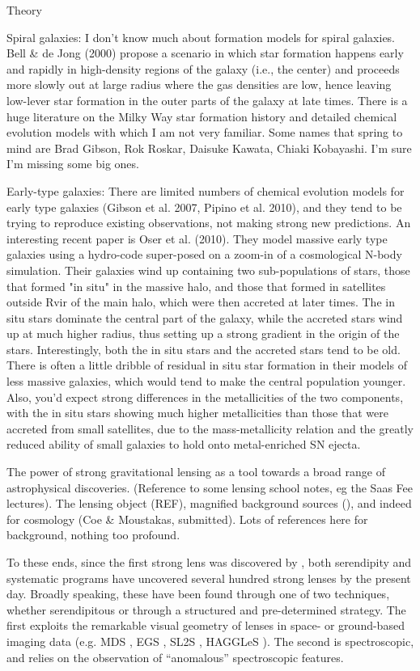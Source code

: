 \message{ !name(clashresolved.tex)}\documentclass{emulateapj}
\begin{document}
Theory

Spiral galaxies: I don't know much about formation models for spiral
galaxies.  Bell \& de Jong (2000) propose a scenario in which star
formation happens early and rapidly in high-density regions of the
galaxy (i.e., the center) and proceeds more slowly out at large radius
where the gas densities are low, hence leaving low-lever star
formation in the outer parts of the galaxy at late times.  There is a
huge literature on the Milky Way star formation history and detailed
chemical evolution models with which I am not very familiar.  Some
names that spring to mind are Brad Gibson, Rok Roskar, Daisuke Kawata,
Chiaki Kobayashi.  I'm sure I'm missing some big ones.

Early-type galaxies: There are limited numbers of chemical evolution
models for early type galaxies (Gibson et al. 2007, Pipino et
al. 2010), and they tend to be trying to reproduce existing
observations, not making strong new predictions.  An interesting
recent paper is Oser et al. (2010).  They model massive early type
galaxies using a hydro-code super-posed on a zoom-in of a cosmological
N-body simulation.  Their galaxies wind up containing two
sub-populations of stars, those that formed "in situ" in the massive
halo, and those that formed in satellites outside Rvir of the main
halo, which were then accreted at later times.  The in situ stars
dominate the central part of the galaxy, while the accreted stars wind
up at much higher radius, thus setting up a strong gradient in the
origin of the stars.  Interestingly, both the in situ stars and the
accreted stars tend to be old.  There is often a little dribble of
residual in situ star formation in their models of less massive
galaxies, which would tend to make the central population younger.
Also, you'd expect strong differences in the metallicities of the two
components, with the in situ stars showing much higher metallicities
than those that were accreted from small satellites, due to the
mass-metallicity relation and the greatly reduced ability of small
galaxies to hold onto metal-enriched SN ejecta.


The power of strong gravitational lensing as a tool towards a broad
range of astrophysical discoveries. (Reference to some lensing school
notes, eg the Saas Fee lectures). The lensing object (REF), magnified
background sources (\citealt{bunker:00}), and indeed for cosmology
(Coe \& Moustakas, submitted). Lots of references here for background,
nothing too profound.

To these ends, since the first strong lens was discovered by
\citet{walsh:79}, both serendipity and systematic programs have
uncovered several hundred strong lenses by the present day. Broadly
speaking, these have been found through one of two techniques, whether
serendipitous or through a structured and pre-determined strategy. The
first exploits the remarkable visual geometry of lenses in space- or
ground-based imaging data (e.g. MDS \citet{ratnatunga:99}, EGS
\citet{moustakas:07}, SL2S \citet{cabanac:07}, HAGGLeS
\citet{marshall:09}). The second is spectroscopic, and relies on the
observation of ``anomalous'' spectroscopic features.
\end{document}
